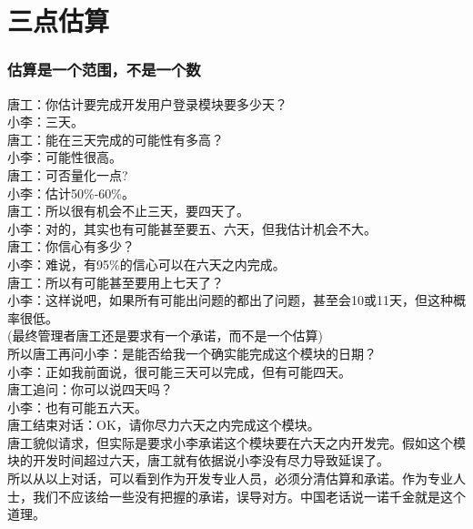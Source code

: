 \chapter{三点估算} %







\hypertarget{ux4f30ux7b97ux662fux4e00ux4e2aux8303ux56f4ux4e0dux662fux4e00ux4e2aux6570}{%
\subsection{估算是一个范围，不是一个数}\label{ux4f30ux7b97ux662fux4e00ux4e2aux8303ux56f4ux4e0dux662fux4e00ux4e2aux6570}}

唐工：你估计要完成开发用户登录模块要多少天？\\
小李：三天。\\
唐工：能在三天完成的可能性有多高？\\
小李：可能性很高。\\
唐工：可否量化一点?\\
小李：估计50\%-60\%。\\
唐工：所以很有机会不止三天，要四天了。\\
小李：对的，其实也有可能甚至要五、六天，但我估计机会不大。\\
唐工：你信心有多少？\\
小李：难说，有95\%的信心可以在六天之内完成。\\
唐工：所以有可能甚至要用上七天了？\\
小李：这样说吧，如果所有可能出问题的都出了问题，甚至会10或11天，但这种概率很低。\\
(最终管理者唐工还是要求有一个承诺，而不是一个估算)\\
所以唐工再问小李：是能否给我一个确实能完成这个模块的日期？\\
小李：正如我前面说，很可能三天可以完成，但有可能四天。\\
唐工追问：你可以说四天吗？\\
小李：也有可能五六天。\\
唐工结束对话：OK，请你尽力六天之内完成这个模块。\\
唐工貌似请求，但实际是要求小李承诺这个模块要在六天之内开发完。假如这个模块的开发时间超过六天，唐工就有依据说小李没有尽力导致延误了。\\
所以从以上对话，可以看到作为开发专业人员，必须分清估算和承诺。作为专业人士，我们不应该给一些没有把握的承诺，误导对方。中国老话说一诺千金就是这个道理。

